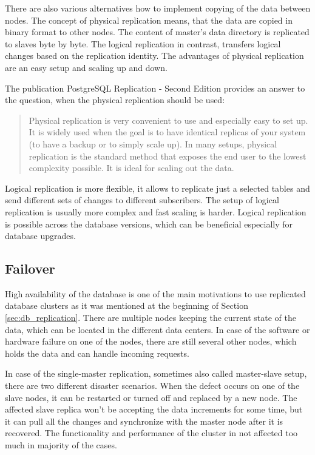 \documentclass[
  digital, %
  twoside, %
  table,   %
  lof,     %
  lot,     %
]{fithesis3}
\begin{document}
There are also various alternatives how to implement copying of the data between nodes. The concept of physical replication means, that the data are copied in binary format to other nodes. The content of master's data directory is replicated to slaves byte by byte. The logical replication in contrast, transfers logical changes based on the replication identity. The advantages of physical replication are an easy setup and scaling up and down.

The publication PostgreSQL Replication - Second Edition provides an answer to the question, when the physical replication should be used:
\begin{quote}
Physical replication is very convenient to use and especially easy to set up. It is
widely used when the goal is to have identical replicas of your system (to have a
backup or to simply scale up).
In many setups, physical replication is the standard method that exposes the end
user to the lowest complexity possible. It is ideal for scaling out the data. \cite[p. 10]{pg}
\end{quote}

Logical replication is more flexible, it allows to replicate just a selected tables and send different sets of changes to different subscribers. The setup of logical replication is usually more complex and fast scaling is harder. Logical replication is possible across the database versions, which can be beneficial especially for database upgrades.

\subsection{Failover} \label{sec:failover}
High availability of the database is one of the main motivations to use replicated database clusters as it was mentioned at the beginning of Section \ref{sec:db_replication}. There are multiple nodes keeping the current state of the data, which can be located in the different data centers. In case of the software or hardware failure on one of the nodes, there are still several other nodes, which holds the data and can handle incoming requests.

In case of the single-master replication, sometimes also called master-slave setup, there are two different disaster scenarios. When the defect occurs on one of the slave nodes, it can be restarted or turned off and replaced by a new node. The affected slave replica won't be accepting the data increments for some time, but it can pull all the changes and synchronize with the master node after it is recovered. The functionality and performance of the cluster in not affected too much in majority of the cases.
\end{document}
